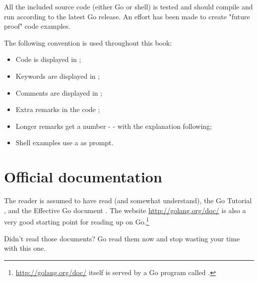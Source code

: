 All the included source code (either Go or shell) is tested
and should compile and run according to the latest Go release. 
An effort has been made to create "future proof" code examples.

The following convention is used throughout this book:
\begin{itemize}
\item Code is displayed in ;
\item Keywords are displayed in ;
\item Comments are displayed in ;
\item Extra remarks in the code ;
\item Longer remarks get a number -  - with the explanation following;
\item Shell examples use a \pr{} as prompt.
\end{itemize}

\section{Official documentation}
The reader is assumed to have read (and somewhat understand), the
Go Tutorial \cite{go_tutorial}, and the Effective Go
document \cite{effective_go}. The
website \url{http://golang.org/doc/} is also a very good starting point
for reading up on Go.\footnote{\url{http://golang.org/doc/} itself is served by 
a Go program called .}

\begin{lbar}
\noindent Didn't read those documents? Go read them now and stop wasting your time
with this one.
\end{lbar}

